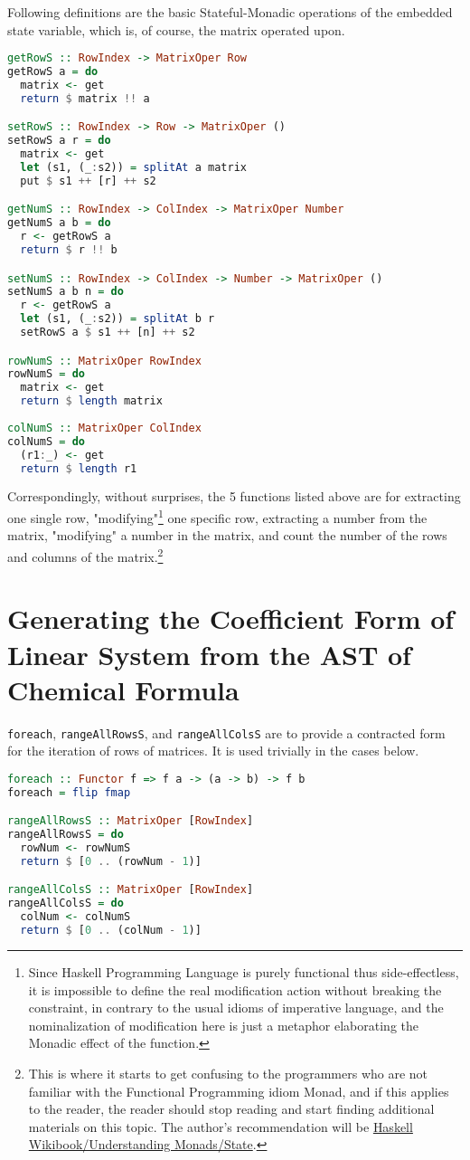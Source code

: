 \documentclass[12pt,a4paper]{article}
\begin{document}
Following definitions are the basic Stateful-Monadic operations of the embedded state variable, which is, of course, the matrix operated upon.
\begin{lstlisting}[language=Haskell]
getRowS :: RowIndex -> MatrixOper Row
getRowS a = do
  matrix <- get
  return $ matrix !! a

setRowS :: RowIndex -> Row -> MatrixOper ()
setRowS a r = do
  matrix <- get
  let (s1, (_:s2)) = splitAt a matrix
  put $ s1 ++ [r] ++ s2

getNumS :: RowIndex -> ColIndex -> MatrixOper Number
getNumS a b = do
  r <- getRowS a
  return $ r !! b

setNumS :: RowIndex -> ColIndex -> Number -> MatrixOper ()
setNumS a b n = do
  r <- getRowS a
  let (s1, (_:s2)) = splitAt b r
  setRowS a $ s1 ++ [n] ++ s2

rowNumS :: MatrixOper RowIndex
rowNumS = do
  matrix <- get
  return $ length matrix
  
colNumS :: MatrixOper ColIndex
colNumS = do
  (r1:_) <- get
  return $ length r1
\end{lstlisting}
Correspondingly, without surprises, the 5 functions listed above are for extracting one single row, "modifying"\footnote{Since Haskell Programming Language is purely functional thus side-effectless, it is impossible to define the real modification action without breaking the constraint, in contrary to the usual idioms of imperative language, and the nominalization of modification here is just a metaphor elaborating the Monadic effect of the function.} one specific row, extracting a number from the matrix, "modifying" a number in the matrix, and count the number of the rows and columns of the matrix.\footnote{This is where it starts to get confusing to the programmers who are not familiar with the Functional Programming idiom Monad, and if this applies to the reader, the reader should stop reading and start finding additional materials on this topic. The author's recommendation will be \href{https://en.wikibooks.org/wiki/Haskell/Understanding_monads/State}{Haskell Wikibook/Understanding Monads/State}.}

\section{Generating the Coefficient Form of Linear System from the AST of Chemical Formula}
\texttt{foreach}, \texttt{rangeAllRowsS}, and \texttt{rangeAllColsS} are to provide a contracted form for the iteration of rows of matrices. It is used trivially in the cases below.
\begin{lstlisting}[language=Haskell]
foreach :: Functor f => f a -> (a -> b) -> f b
foreach = flip fmap

rangeAllRowsS :: MatrixOper [RowIndex]
rangeAllRowsS = do
  rowNum <- rowNumS
  return $ [0 .. (rowNum - 1)]

rangeAllColsS :: MatrixOper [RowIndex]
rangeAllColsS = do
  colNum <- colNumS
  return $ [0 .. (colNum - 1)]
\end{lstlisting}
\end{document}
